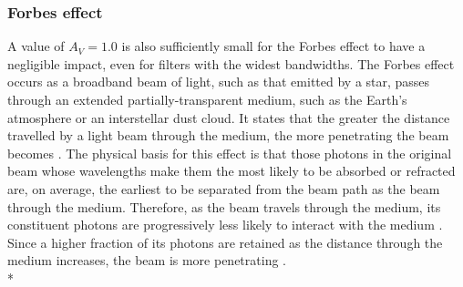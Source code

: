 \documentclass[12pt, a4paper]{report}
\begin{document}
\subsubsection{Forbes effect}
A value of $A_{V} = 1.0$ is also sufficiently small for the Forbes effect to have a negligible impact, even for filters with the widest bandwidths. The Forbes effect occurs as a broadband beam of light, such as that emitted by a star, passes through an extended partially-transparent medium, such as the Earth's atmosphere or an interstellar dust cloud. It states that the greater the distance travelled by a light beam through the medium, the more penetrating the beam becomes \citep{1842RSPT..132..225F}. The physical basis for this effect is that those photons in the original beam whose wavelengths make them the most likely to be absorbed or refracted are, on average, the earliest to be separated from the beam path as the beam through the medium. Therefore, as the beam travels through the medium, its constituent photons are progressively less likely to interact with the medium \citep{1995A&AS..109..293G}. Since a higher fraction of its photons are retained as the distance through the medium increases, the beam is more penetrating \citep{OHVRIL1999305}.\\*
\end{document}
